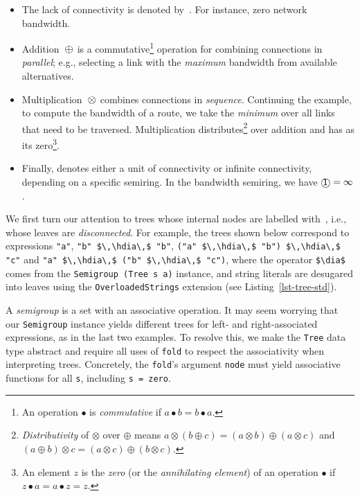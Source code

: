 \documentclass[crc,english]{programming}
\newcommand{\code}[1]{\lstinline[mathescape]|#1|}
\newcommand{\hcode}[1]{{\color{darkblue} \lstinline[keywordstyle={}]|#1|}} %
\newcommand{\hdia}{\,\text{\raisebox{-0.2mm}{\Large\color{darkblue} $\diamond$}}\,}
\newcommand{\add}{\text{\raisebox{-0.1mm}{\large $\oplus$}}}
\newcommand{\mul}{\text{\raisebox{-0.1mm}{\large $\otimes$}}}
\newcommand{\zero}{\raisebox{-0.2mm}{\textcircled{\textsf{0}}}\xspace}
\newcommand{\one}{\raisebox{-0.2mm}{\textcircled{\textsf{\hspace{-0.2mm}1}}}\xspace}
\newcommand{\dia}{\,\text{\raisebox{-0.3mm}{\Large $\diamond$}}\,}
\begin{document}
\vspace{-1mm}
\begin{itemize}
  \item The lack of connectivity is denoted by~\zero. For instance, zero network
        bandwidth.
  \item Addition~$\add$ is a commutative\footnote{
            An operation $\bullet$ is \emph{commutative} if
            $a \bullet b = b \bullet a$.
        } operation for combining connections in \emph{parallel}; e.g.,
        selecting a link with the \emph{maximum} bandwidth from available
        alternatives.
  \item Multiplication~$\mul$ combines connections in \emph{sequence}.
        Continuing the example, to compute the bandwidth of a route, we take the
        \emph{minimum} over all links that need to be traversed. Multiplication
        distributes\footnote{
            \emph{Distributivity} of $\otimes$ over $\oplus$ means
            $a \otimes (b \oplus c) = (a \otimes b) \oplus (a \otimes c)$ and
            $(a \oplus b) \otimes c = (a \otimes c) \oplus (b \otimes c)$.
        } over addition and has \zero as its zero\footnote{
            An element $z$ is the \emph{zero} (or the
            \emph{annihilating element}) of an operation $\bullet$ if
            $z \bullet a = a \bullet z = z$.
        }.
  \item Finally, \one denotes either a unit of connectivity or infinite
        connectivity, depending on a specific semiring. In the bandwidth
        semiring, we have $\text{\one} = \infty$.
\end{itemize}

\noindent
We first turn our attention to trees whose internal nodes are labelled
with~\zero, i.e., whose leaves are \emph{disconnected}. For example, the trees
shown below correspond to expressions \code{"a"}, \code{"b" $\,\hdia\,$ "b"},
\code{("a" $\,\hdia\,$ "b") $\,\hdia\,$ "c"} and
\code{"a" $\,\hdia\,$ ("b" $\,\hdia\,$ "c")}, where the operator \code{$\dia$}
comes from the \code{Semigroup (Tree s a)} instance, and string literals are
desugared into leaves using the \code{OverloadedStrings} extension
(see Listing~\ref{lst-tree-std}).

\vspace{2.2mm}
\hfill\hfill
\vspace{2.3mm}

\noindent
A \emph{semigroup} is a set with an associative operation. It may seem worrying
that our \code{Semigroup} instance yields different trees for left- and
right-associated expressions, as in the last two examples. To resolve this, we
make the \code{Tree} data type abstract and require all uses of \hcode{fold} to
respect the associativity when interpreting trees. Concretely, the
\hcode{fold}'s argument \hcode{node} must yield associative functions for all
\hcode{s}, including \hcode{s = zero}.
\end{document}
